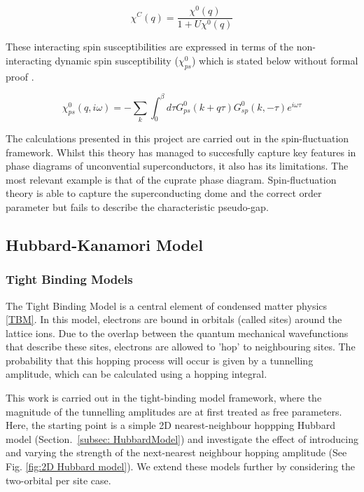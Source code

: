 \documentclass[12pt]{article}
\begin{document}
\begin{equation}
    \chi^C(q) = \frac{\chi^0(q)}{1 + U \chi^0 (q)}
\end{equation}

\noindent These interacting spin susceptibilities are expressed in terms of the non-interacting dynamic spin susceptibility ($\chi_{ps}^0$) which is stated below without formal proof \cite{moriya2000spin}. 

\begin{equation}\label{chi 0}
    \chi_{ps}^0(q, i \omega) = -\sum_{k} \int_{0}^{\beta} d\tau G^0_{ps}(k+q \tau) G^0_{sp}(k, -\tau)e^{i\omega \tau}
\end{equation} 

\noindent The calculations presented in this project are carried out in the spin-fluctuation framework. 
Whilst this theory has managed to succesfully capture key features in phase diagrams of unconvential superconductors, it also has its limitations.
The most relevant example is that of the cuprate phase diagram.
Spin-fluctuation theory is able to capture the superconducting dome and the correct order parameter \cite{moriya2006developments, scalapino1995case} 
but fails
to describe the characteristic pseudo-gap\cite{timusk1999pseudogap}. 

\subsection{Hubbard-Kanamori Model}

\subsubsection{Tight Binding Models}

The Tight Binding Model is a central element of condensed matter physics \eqref{TBM}. In this model, electrons are bound in orbitals (called sites) around the lattice ions.
Due to the overlap between the quantum mechanical wavefunctions that describe these sites, electrons are allowed to 'hop' to neighbouring sites. The probability that this hopping process will occur is given by a tunnelling amplitude, which can be calculated using a hopping integral. \par
\medskip
\noindent This work is carried out in the tight-binding model framework, where the magnitude of the tunnelling amplitudes are at first treated as free parameters. 
Here, the starting point is a simple 2D nearest-neighbour hoppping Hubbard model (Section.~\ref{subsec: HubbardModel}) and investigate the effect of introducing and varying the strength of the next-nearest neighbour hopping amplitude (See Fig. \ref{fig:2D Hubbard model}).
We extend these models further by considering the two-orbital per site case. 
\end{document}
